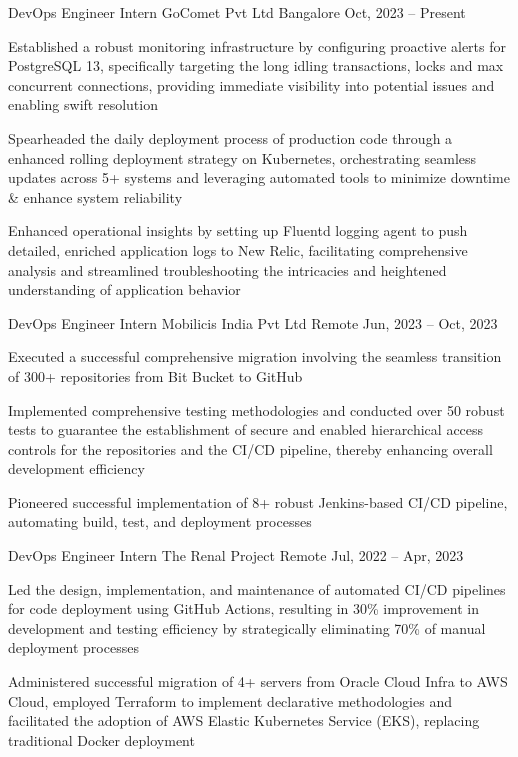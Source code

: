 \documentclass[]{awesome-cv}
\begin{document}
\begin{cventries}
    \cventry
    {DevOps Engineer Intern}
    {GoComet Pvt Ltd}
    {Bangalore}
    {Oct, 2023 – Present}
    {\begin{cvitems}
            \item {Established a robust monitoring infrastructure by configuring proactive alerts for PostgreSQL 13, specifically targeting the long idling transactions, locks and max concurrent connections, providing immediate visibility into potential issues and enabling swift resolution}
            \item {Spearheaded the daily deployment process of production code through a enhanced rolling deployment strategy on Kubernetes, orchestrating seamless updates across 5+ systems and leveraging automated tools to minimize downtime \& enhance system reliability}
            \item {Enhanced operational insights by setting up Fluentd logging agent to push detailed, enriched application logs to New Relic, facilitating comprehensive analysis and streamlined troubleshooting the intricacies and heightened understanding of application behavior}
        \end{cvitems}}
    \cventry
    {DevOps Engineer Intern}
    {Mobilicis India Pvt Ltd}
    {Remote}
    {Jun, 2023 – Oct, 2023}
    {\begin{cvitems}
            \item {Executed a successful comprehensive migration involving the seamless transition of 300+ repositories from Bit Bucket to GitHub}
            \item {Implemented comprehensive testing methodologies and conducted over 50 robust tests to guarantee the establishment of secure and enabled hierarchical access controls for the repositories and the CI/CD pipeline, thereby enhancing overall development efficiency}
            \item {Pioneered successful implementation of 8+ robust Jenkins-based CI/CD pipeline, automating build, test, and deployment processes}
        \end{cvitems}}
    \cventry
    {DevOps Engineer Intern}
    {The Renal Project}
    {Remote}
    {Jul, 2022 – Apr, 2023}
    {\begin{cvitems}
            \item {Led the design, implementation, and maintenance of automated CI/CD pipelines for code deployment using GitHub Actions, resulting in 30\% improvement in development and testing efficiency by strategically eliminating 70\% of manual deployment processes}
            \item {Administered successful migration of 4+ servers from Oracle Cloud Infra to AWS Cloud, employed Terraform to implement declarative methodologies and facilitated the adoption of AWS Elastic Kubernetes Service (EKS), replacing traditional Docker deployment}
        \end{cvitems}}
\end{cventries}
\vspace{-5mm}
\end{document}
